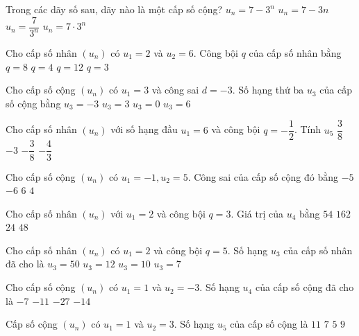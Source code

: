 \begin{ex}
Trong các dãy số sau, dãy nào là một cấp số cộng?
\choice
{$u_n=7-3^n$}
{\True $u_n=7-3n$}
{$u_n=\dfrac{7}{3^n}$}
{$u_n=7 \cdot 3^n$}
\end{ex}
\begin{ex}
Cho cấp số nhân $(u_n)$ có $u_1=2$ và $u_2=6$. Công bội $q$ của cấp số nhân bằng
\choice
{$q=8$}
{$q=4$}
{$q=12$}
{\True $q=3$}
\end{ex}
\begin{ex}
Cho cấp số cộng $(u_n)$ có $u_1=3$ và công sai $d=-3$. Số hạng thứ ba $u_3$ của cấp số cộng bằng
\choice
{\True $u_3=-3$}
{$u_3=3$}
{$u_3=0$}
{$u_3=6$}
\end{ex}
\begin{ex}
Cho cấp số nhân $(u_n)$ với số hạng đầu $u_1=6$ và công bội $q=-\dfrac{1}{2}$. Tính $u_5$
\choice
{\True $\dfrac{3}{8}$}
{$-3$}
{$-\dfrac{3}{8}$}
{$-\dfrac{4}{3}$}
\end{ex}
\begin{ex}
Cho cấp số cộng $(u_n)$ có $u_1=-1,u_2=5$. Công sai của cấp số cộng đó bằng
\choice
{$-5$}
{$-6$}
{\True $6$}
{$4$}
\end{ex}
\begin{ex}
Cho cấp số nhân $(u_n)$ với $u_1=2$ và công bội $q=3$. Giá trị của $u_4$ bằng
\choice
{\True $54$}
{$162$}
{$24$}
{$48$}
\end{ex}
\begin{ex}
Cho cấp số nhân $(u_n)$ có $u_1=2$ và công bội $q=5$. Số hạng $u_3$ của cấp số nhân đã cho là
\choice
{\True $u_3=50$}
{$u_3=12$}
{$u_3=10$}
{$u_3=7$}
\end{ex}
\begin{ex}
Cho cấp số cộng $(u_n)$ có $u_1=1$ và $u_2=-3$. Số hạng $u_4$ của cấp số cộng đã cho là
\choice
{$-7$}
{\True $-11$}
{$-27$}
{$-14$}
\end{ex}
\begin{ex}
Cấp số cộng $(u_n)$ có $u_1=1$ và $u_2=3$. Số hạng $u_5$ của cấp số cộng là
\choice
{$11$}
{$7$}
{$5$}
{\True $9$}
\end{ex}
